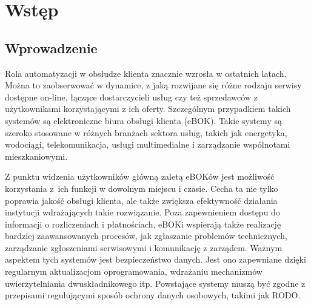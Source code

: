 \chapter{Wstęp}
\section{Wprowadzenie}
Rola automatyzacji w obsłudze klienta znacznie wzrosła w ostatnich latach. Można to zaobserwować w dynamice, z jaką rozwijane się różne rodzaju serwisy dostępne on-line, łączące dostarczycieli usług czy też sprzedawców z użytkownikami korzystającymi z ich oferty. Szczególnym przypadkiem takich systemów są elektroniczne biura obsługi klienta (eBOK). Takie systemy są szeroko stosowane w różnych branżach sektora usług, takich jak energetyka, wodociągi, telekomunikacja, usługi multimedialne i zarządzanie wspólnotami mieszkaniowymi.

Z punktu widzenia użytkowników główną zaletą eBOKów jest możliwość korzystania z~ich funkcji w dowolnym miejscu i czasie. Cecha ta nie tylko poprawia jakość obsługi klienta, ale także zwiększa efektywność działania instytucji wdrażających takie rozwiązanie. Poza zapewnieniem dostępu do informacji o rozliczeniach i płatnościach, eBOKi wspierają także realizację bardziej zaawansowanych procesów, jak zgłaszanie problemów technicznych, zarządzanie zgłoszeniami serwisowymi i komunikację z zarządem. Ważnym aspektem tych systemów jest bezpieczeństwo danych. Jest ono zapewniane dzięki regularnym aktualizacjom oprogramowania, wdrażaniu mechanizmów uwierzytelniania dwuskładnikowego itp. Powstające systemy muszą być zgodne z przepisami regulującymi sposób ochrony danych osobowych, takimi jak RODO.

